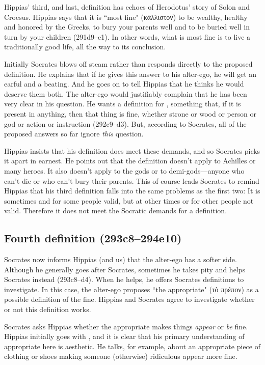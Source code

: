 \documentclass[11pt]{article}
\begin{document}
Hippias' third, and last, definition has echoes of Herodotus' story of
Solon and Croesus.  Hippias says that it is ``most fine" ({\g κάλλιστον})
to be wealthy, healthy and honored by the Greeks, to bury your parents well
and to be buried well in turn by your children (291d9--e1).  In other
words, what is most fine is to live a traditionally good life, all the way
to its conclusion.

Initially Socrates blows off steam rather than responds directly to the
proposed definition.  He explains that if he gives this answer to his
alter-ego, he will get an earful and a beating.  And he goes on to tell
Hippias that he thinks he would deserve them both.  The alter-ego would
justifiably complain that he has been very clear in his question. He wants
a definition for , something that, if it is present in
anything, then that thing is fine, whether strone or wood or person or god
or action or instruction (292c9--d3).  But, according to Socrates, all of
the proposed answers so far ignore \emph{this} question.

Hippias insists that his definition does meet these demands, and so
Socrates picks it apart in earnest.  He points out that the definition
doesn't apply to Achilles or many heroes.  It also doesn't apply to the
gods or to demi-gods---anyone who can't die or who can't bury their
parents.  This of course leads Socrates to remind Hippias that his third
definition falls into the same problems as the first two: It is sometimes
and for some people valid, but at other times or for other people not
valid.  Therefore it does not meet the Socratic demands for a definition.


\subsection{Fourth definition (293c8--294e10)}

Socrates now informs Hippias (and us) that the alter-ego has a softer side.
Although he generally goes after Socrates, sometimes he takes pity and
helps Socrates instead (293c8--d4).  When he helps, he offers Socrates
definitions to investigate.  In this case, the alter-ego proposes ``the
appropriate" (τὸ πρέπον) as a possible definition of the fine. Hippias and
Socrates agree to investigate whether or not this definition works.

Socrates asks Hippias whether the appropriate makes things \emph{appear} or
\emph{be} fine.  Hippias initially goes with , and it is clear
that his primary understanding of appropriate here is aesthetic.  He talks,
for example, about an appropriate piece of clothing or shoes making someone
(otherwise) ridiculous appear more fine.
\end{document}
